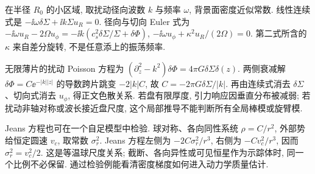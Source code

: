 在半径 $R_0$ 的小区域, 取扰动径向波数 $k$ 与频率 $\omega$, 背景面密度近似常数. 线性连续式是 $-\ii\omega\delta\Sigma+\ii k\Sigma u_R=0$. 径向与切向 Euler 式为 $-\ii\omega u_R-2\Omega u_\phi=-\ii k(c_s^2\delta\Sigma/\Sigma+\delta\Phi)$, $-\ii\omega u_\phi+\kappa^2u_R/(2\Omega)=0$. 第二式所含的 $\kappa$ 来自差分旋转, 不是任意添上的振荡频率.

无限薄片的扰动 Poisson 方程为 $(\partial_z^2-k^2)\delta\Phi=4\pi G\delta\Sigma\delta(z)$. 两侧衰减解 $\delta\Phi=C\ee^{-|k||z|}$ 的导数跨片跳变 $-2|k|C$, 故 $C=-2\pi G\delta\Sigma/|k|$. 再由连续式消去 $\delta\Sigma$、切向式消去 $u_\phi$, 得正文色散关系. 若盘有限厚度, 引力响应因垂直分布被减弱; 若扰动非轴对称或波长接近盘尺度, 这个局部推导不能判断所有全局棒模或旋臂模.

Jeans 方程也可在一个自足模型中检验. 球对称、各向同性系统 $\rho=C/r^2$, 外部势给恒定圆速 $v_c$, 取常数 $\sigma_r^2$. Jeans 方程左侧为 $-2C\sigma_r^2/r^3$, 右侧为 $-Cv_c^2/r^3$, 因而 $\sigma_r^2=v_c^2/2$. 这是等温球尺度关系; 截断、各向异性或可见恒星作为示踪体时, 同一个比例不必保留. 通过检验例能看清密度梯度如何进入动力学质量估计.
